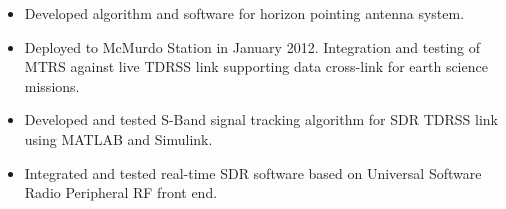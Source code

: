     \begin{itemize}
        \item Developed algorithm and software for horizon pointing antenna system.
        \item Deployed to McMurdo Station in January 2012. Integration and testing of MTRS against live TDRSS link supporting data cross-link for earth science missions.
    \end{itemize}

    \begin{itemize}
        \item Developed and tested S-Band signal tracking algorithm for SDR TDRSS link using MATLAB and Simulink.
        \item Integrated and tested real-time SDR software based on Universal Software Radio Peripheral RF front end.
    \end{itemize}
\EndJob

\EndJob
